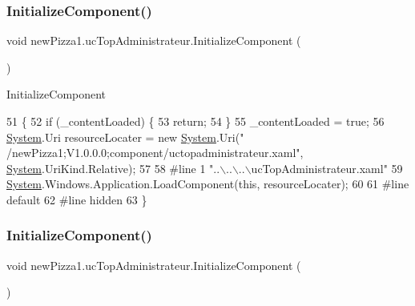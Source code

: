 \subsubsection{\texorpdfstring{Initialize\+Component()}{InitializeComponent()}\hspace{0.1cm}{\footnotesize\ttfamily [1/4]}}
{\footnotesize\ttfamily void new\+Pizza1.\+uc\+Top\+Administrateur.\+Initialize\+Component (\begin{DoxyParamCaption}{ }\end{DoxyParamCaption})\hspace{0.3cm}{\ttfamily [inline]}}



Initialize\+Component 


\begin{DoxyCode}
51                                           \{
52             \textcolor{keywordflow}{if} (\_contentLoaded) \{
53                 \textcolor{keywordflow}{return};
54             \}
55             \_contentLoaded = \textcolor{keyword}{true};
56             \hyperlink{namespaceSystem}{System}.Uri resourceLocater = \textcolor{keyword}{new} \hyperlink{namespaceSystem}{System}.Uri(\textcolor{stringliteral}{"
      /newPizza1;V1.0.0.0;component/uctopadministrateur.xaml"}, \hyperlink{namespaceSystem}{System}.UriKind.Relative);
57             
58 \textcolor{preprocessor}{            #line 1 "..\(\backslash\)..\(\backslash\)..\(\backslash\)ucTopAdministrateur.xaml"}
59             \hyperlink{namespaceSystem}{System}.Windows.Application.LoadComponent(\textcolor{keyword}{this}, resourceLocater);
60             
61 \textcolor{preprocessor}{            #line default}
62 \textcolor{preprocessor}{            #line hidden}
63         \}
\end{DoxyCode}
\mbox{\label{classnewPizza1_1_1ucTopAdministrateur_a79b4fb5df50a0755f8616ccd6d462953}} 
\subsubsection{\texorpdfstring{Initialize\+Component()}{InitializeComponent()}\hspace{0.1cm}{\footnotesize\ttfamily [2/4]}}
{\footnotesize\ttfamily void new\+Pizza1.\+uc\+Top\+Administrateur.\+Initialize\+Component (\begin{DoxyParamCaption}{ }\end{DoxyParamCaption})\hspace{0.3cm}{\ttfamily [inline]}}



